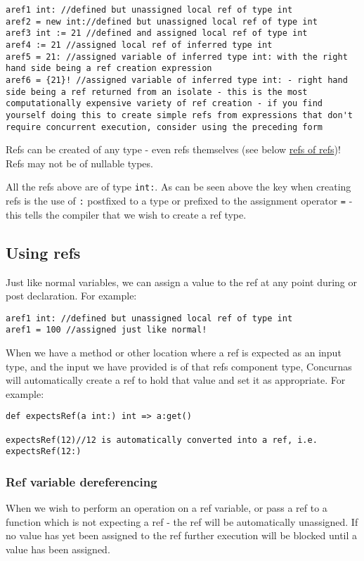 \documentclass[conc-doc]{subfiles}
\begin{document}
\begin{lstlisting}
aref1 int: //defined but unassigned local ref of type int
aref2 = new int://defined but unassigned local ref of type int
aref3 int := 21 //defined and assigned local ref of type int
aref4 := 21 //assigned local ref of inferred type int
aref5 = 21: //assigned variable of inferred type int: with the right hand side being a ref creation expression
aref6 = {21}! //assigned variable of inferred type int: - right hand side being a ref returned from an isolate - this is the most computationally expensive variety of ref creation - if you find yourself doing this to create simple refs from expressions that don't require concurrent execution, consider using the preceding form
\end{lstlisting}

Refs can be created of any type - even refs themselves (see below \hyperref[subsec:refofref]{refs of refs})! Refs may not be of nullable types.

All the refs above are of type \lstinline{int:}. As can be seen above the key when creating refs is the use of \lstinline{:} postfixed to a type or prefixed to the assignment operator \lstinline{=} - this tells the compiler that we wish to create a ref type.

\subsection{Using refs}
Just like normal variables, we can assign a value to the ref at any point during or post declaration. For example:

\begin{lstlisting}
aref1 int: //defined but unassigned local ref of type int
aref1 = 100 //assigned just like normal!
\end{lstlisting}

When we have a method or other location where a ref is expected as an input type, and the input we have provided is of that refs component type, Concurnas will automatically create a ref to hold that value and set it as appropriate. For example:

\begin{lstlisting}
def expectsRef(a int:) int => a:get()

expectsRef(12)//12 is automatically converted into a ref, i.e. expectsRef(12:)
\end{lstlisting}


\subsubsection{Ref variable dereferencing}
When we wish to perform an operation on a ref variable, or pass a ref to a function which is not expecting a ref - the ref will be automatically unassigned. If no value has yet been assigned to the ref further execution will be blocked until a value has been assigned.
\end{document}
